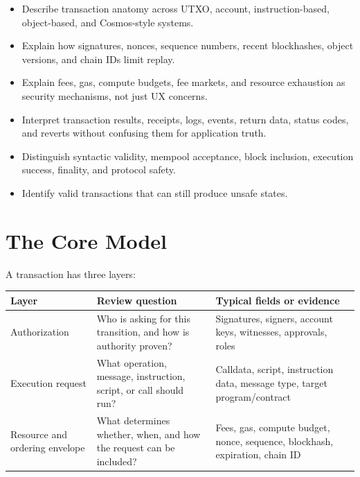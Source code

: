 \begin{itemize}
\tightlist
\item
  Describe transaction anatomy across UTXO, account, instruction-based,
  object-based, and Cosmos-style systems.
\item
  Explain how signatures, nonces, sequence numbers, recent blockhashes,
  object versions, and chain IDs limit replay.
\item
  Explain fees, gas, compute budgets, fee markets, and resource
  exhaustion as security mechanisms, not just UX concerns.
\item
  Interpret transaction results, receipts, logs, events, return data,
  status codes, and reverts without confusing them for application
  truth.
\item
  Distinguish syntactic validity, mempool acceptance, block inclusion,
  execution success, finality, and protocol safety.
\item
  Identify valid transactions that can still produce unsafe states.
\end{itemize}

\section{The Core Model}

A transaction has three layers:

{\def\LTcaptype{none} %
\begin{longtable}[]{@{}
  >{\raggedright\arraybackslash}p{}
  >{\raggedright\arraybackslash}p{}
  >{\raggedright\arraybackslash}p{}@{}}
\toprule\noalign{}
\begin{minipage}[b]{\linewidth}\raggedright
Layer
\end{minipage} & \begin{minipage}[b]{\linewidth}\raggedright
Review question
\end{minipage} & \begin{minipage}[b]{\linewidth}\raggedright
Typical fields or evidence
\end{minipage} \\
\midrule\noalign{}
\endhead
\bottomrule\noalign{}
\endlastfoot
Authorization & Who is asking for this transition, and how is authority
proven? & Signatures, signers, account keys, witnesses, approvals,
roles \\
Execution request & What operation, message, instruction, script, or
call should run? & Calldata, script, instruction data, message type,
target program/contract \\
Resource and ordering envelope & What determines whether, when, and how
the request can be included? & Fees, gas, compute budget, nonce,
sequence, blockhash, expiration, chain ID \\
\end{longtable}
}

